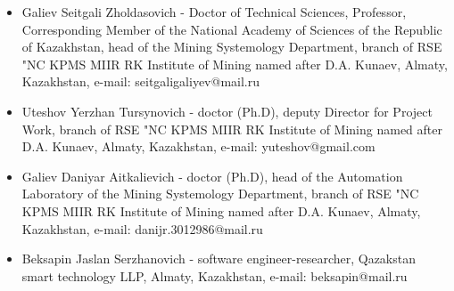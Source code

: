 \begin{itemize}
\item
Galiev Seitgali Zholdasovich - Doctor of Technical Sciences, Professor,
Corresponding Member of the National Academy of Sciences of the Republic
of Kazakhstan, head of the Mining Systemology Department, branch of RSE
"NC KPMS MIIR RK Institute of Mining named after D.A. Kunaev, Almaty,
Kazakhstan, e-mail:
seitgaligaliyev@mail.ru

\item
Uteshov Yerzhan Tursynovich - doctor (Ph.D), deputy Director for
Project Work, branch of RSE "NC KPMS MIIR RK Institute of Mining named
after D.A. Kunaev, Almaty, Kazakhstan, e-mail:
yuteshov@gmail.com

\item
Galiev Daniyar Aitkalievich - doctor (Ph.D), head of the Automation
Laboratory of the Mining Systemology Department, branch of RSE "NC KPMS
MIIR RK Institute of Mining named after D.A. Kunaev, Almaty, Kazakhstan,
e-mail:
danijr.3012986@mail.ru

\item
Beksapin Jaslan Serzhanovich - software engineer-researcher, Qazakstan
smart technology LLP, Almaty, Kazakhstan, e-mail: beksapin@mail.ru
\end{itemize}
